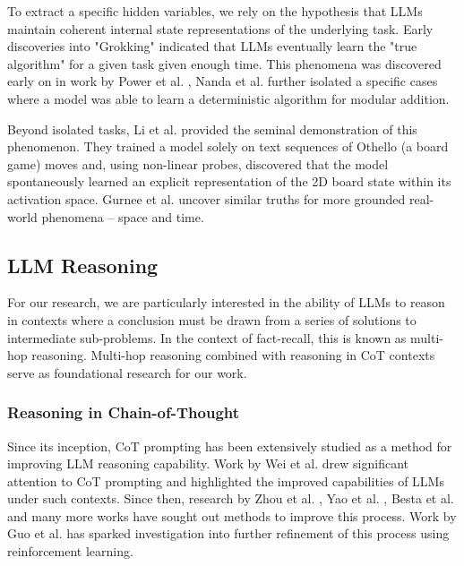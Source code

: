 \documentclass[11pt]{article}
\begin{document}

To extract a specific hidden variables, we rely on the hypothesis that LLMs maintain coherent internal state representations of the underlying task. Early discoveries into "Grokking" indicated that LLMs eventually learn the "true algorithm" for a given task given enough time. This phenomena was discovered early on in work by Power et al. \cite{power2022grokking}, Nanda et al. \cite{nanda2023progress} further isolated a specific cases where a model was able to learn a deterministic algorithm for modular addition. 


Beyond isolated tasks, Li et al. \cite{li2022emergent} provided the seminal demonstration of this phenomenon. They trained a model solely on text sequences of Othello (a board game) moves and, using non-linear probes, discovered that the model spontaneously learned an explicit representation of the 2D board state within its activation space. Gurnee et al. \cite{gurnee2023language} uncover similar truths for more grounded real-world phenomena -- space and time. 

\subsection{LLM Reasoning}
For our research, we are particularly interested in the ability of LLMs to reason in contexts where a conclusion must be drawn from a series of solutions to intermediate sub-problems. In the context of fact-recall, this is known as multi-hop reasoning. Multi-hop reasoning combined with reasoning in CoT contexts serve as foundational research for our work. 

\subsubsection{Reasoning in Chain-of-Thought}


Since its inception, CoT prompting has been extensively studied as a method for improving LLM reasoning capability. Work by Wei et al. \cite{wei2022chain} drew significant attention to CoT prompting and highlighted the improved capabilities of LLMs under such contexts. Since then, research by Zhou et al. \cite{zhou2022least}, Yao et al. \cite{yao2023tree}, Besta et al. \cite{besta2024graph} and many more works have sought out methods to improve this process. Work by Guo et al. \cite{guo2025deepseek} has sparked investigation into further refinement of this process using reinforcement learning. 
\end{document}
